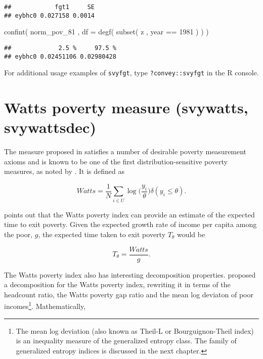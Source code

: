 \documentclass[
]{book}
\newenvironment{Shaded}{\begin{snugshade}}{\end{snugshade}}
\newcommand{\AttributeTok}[1]{\textcolor[rgb]{0.77,0.63,0.00}{#1}}
\newcommand{\DecValTok}[1]{\textcolor[rgb]{0.00,0.00,0.81}{#1}}
\newcommand{\FunctionTok}[1]{\textcolor[rgb]{0.00,0.00,0.00}{#1}}
\newcommand{\NormalTok}[1]{#1}
\newcommand{\SpecialCharTok}[1]{\textcolor[rgb]{0.00,0.00,0.00}{#1}}
\begin{document}
\begin{verbatim}
##            fgt1     SE
## eybhc0 0.027158 0.0014
\end{verbatim}

\begin{Shaded}
\begin{Highlighting}[]
\FunctionTok{confint}\NormalTok{( norm\_pov\_81 , }\AttributeTok{df =} \FunctionTok{degf}\NormalTok{( }\FunctionTok{subset}\NormalTok{( z , year }\SpecialCharTok{==} \DecValTok{1981}\NormalTok{ ) ) )}
\end{Highlighting}
\end{Shaded}

\begin{verbatim}
##             2.5 %     97.5 %
## eybhc0 0.02451106 0.02980428
\end{verbatim}

For additional usage examples of \texttt{svyfgt}, type \texttt{?convey::svyfgt} in the R console.

\hypertarget{watts-poverty-measure-svywatts-svywattsdec}{%
\section{Watts poverty measure (svywatts, svywattsdec)}\label{watts-poverty-measure-svywatts-svywattsdec}}

The measure proposed in \textcite{watts1968} satisfies a number of desirable poverty measurement axioms and is known to be one of the first distribution-sensitive poverty measures, as noted by \textcite{haughton2009}. It is defined as

\[
Watts = \frac{1}{N} \sum_{i \in U} \log{ \bigg( \frac{y_i}{\theta} \bigg) \delta ( y_i \leqslant \theta) }.
\]

\textcite{murdoch1998} points out that the Watts poverty index can provide an estimate of the expected time to exit poverty. Given the expected growth rate of income per capita among the poor, \(g\), the expected time taken to exit poverty \(T_\theta\) would be

\[
T_\theta = \frac{Watts}{g}.
\]

The Watts poverty index also has interesting decomposition properties. \textcite{blackburn1989} proposed a decomposition for the Watts poverty index, rewriting it in terms of the headcount ratio, the Watts poverty gap ratio and the mean log deviaton of poor incomes\footnote{The mean log deviation (also known as Theil-L or Bourguignon-Theil index) is an inequality measure of the generalized entropy class. The family of generalized entropy indices is discussed in the next chapter.}. Mathematically,
\end{document}

